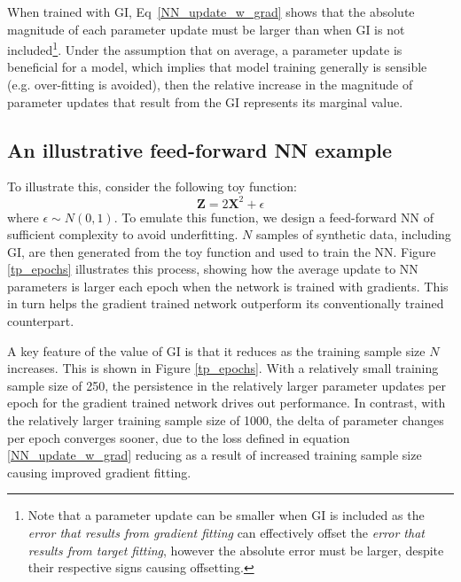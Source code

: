 \documentclass{article}
\begin{document}
When trained with GI, Eq~\ref{NN_update_w_grad} shows that the absolute magnitude of each parameter update must be larger than when GI is not included\footnote{Note that a parameter update can be smaller when GI is included as the \textit{error that results from gradient fitting} can effectively offset the \textit{error that results from target fitting}, however the absolute error must be larger, despite their respective signs causing offsetting.}. Under the assumption that on average, a parameter update is beneficial for a model, which implies that model training generally is sensible (e.g. over-fitting is avoided), then the relative increase in the magnitude of parameter updates that result from the GI represents its marginal value. 

\subsection{An illustrative feed-forward NN example}


To illustrate this, consider the following toy function:
\begin{equation}
    \label{toy_func}
	\mathbf{Z} = 2\mathbf{X}^2 + \epsilon
\end{equation}
where $\epsilon \sim N(0, 1)$. To emulate this function, we design a feed-forward NN of sufficient complexity to avoid underfitting. $N$ samples of synthetic data, including GI, are then generated from the toy function and used to train the NN. Figure \ref{tp_epochs} illustrates this process, showing how the average update to NN parameters is larger each epoch when the network is trained with gradients. This in turn helps the gradient trained network outperform its conventionally trained counterpart. 

A key feature of the value of GI is that it reduces as the training sample size $N$ increases. This is shown in Figure \ref{tp_epochs}. With a relatively small training sample size of 250, the persistence in the relatively larger parameter updates per epoch for the gradient trained network drives out performance. In contrast, with the relatively larger training sample size of 1000, the delta of parameter changes per epoch converges sooner, due to the loss defined in equation \ref{NN_update_w_grad} reducing as a result of increased training sample size causing improved gradient fitting. 
\end{document}
